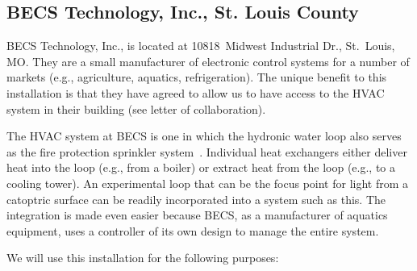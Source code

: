 \subsection{BECS Technology, Inc., St. Louis County}

BECS Technology, Inc., is located at
10818~Midwest Industrial Dr., St.~Louis, MO.
They are a small manufacturer of electronic control
systems for a number of markets (e.g., agriculture, aquatics, refrigeration).
The unique benefit to this installation is that they have agreed to
allow us to have access to the HVAC system in their building (see letter
of collaboration).

The HVAC system at BECS is one in which the hydronic water loop
also serves as the fire protection sprinkler system~\cite{Janus01,wm79}.
Individual heat exchangers either deliver heat into the loop 
(e.g., from a boiler) or extract heat from the loop (e.g., to a
cooling tower).
An experimental loop that can be the focus point for light from
a catoptric surface can be readily incorporated into a system such
as this.  The integration is made even easier because BECS, as
a manufacturer of aquatics equipment, uses a controller of its own
design to manage the entire system.

We will use this installation for the following purposes:

